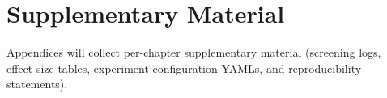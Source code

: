 \chapter{Supplementary Material}

Appendices will collect per-chapter supplementary material (screening logs, effect-size
tables, experiment configuration YAMLs, and reproducibility statements).
